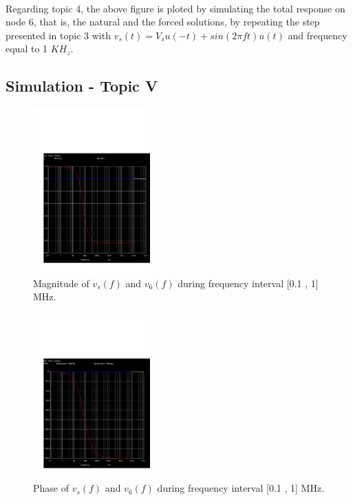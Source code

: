 \paragraph{}
Regarding topic 4, the above figure is ploted by simulating the total response on node 6, that is, the natural and the forced solutions, by repeating the step presented in topic 3 with $v_s(t) = V_s u(-t) + sin(2 \pi ft) u(t)$ and frequency equal to 1 $KH_z$. 


\subsection{Simulation - Topic V}
\label{subsec:sim_fifth}

\begin{figure}[H] \centering
\includegraphics[width=0.4\textwidth]{acm.pdf}
\caption{Magnitude of $v_s(f)$ and $v_6(f)$ during frequency interval [0.1 , 1] MHz.}
\label{fig:$V_s(f)$}
\end{figure}


\begin{figure}[H] \centering
\includegraphics[width=0.4\textwidth]{acp.pdf}
\caption{Phase of $v_s(f)$ and $v_6(f)$ during frequency interval [0.1 , 1] MHz.}
\label{fig:$V_6(f)$}
\end{figure}

